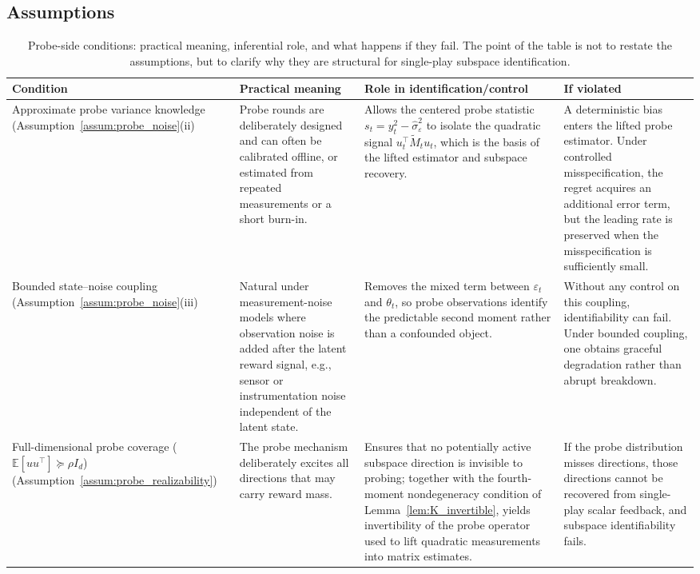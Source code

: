 \documentclass{article}
\begin{document}
\subsection{Assumptions}
\begin{table}[!htpb]
\centering
\small
\setlength{\tabcolsep}{4pt}
\renewcommand{\arraystretch}{1.12}
\caption{Probe-side conditions: practical meaning, inferential role, and what happens if they fail. The point of the table is not to restate the assumptions, but to clarify why they are structural for single-play subspace identification.}
\label{tab:probe_assumptions}
\begin{tabularx}{\linewidth}{
>{\raggedright\arraybackslash}p{2.2cm}
>{\raggedright\arraybackslash}X
>{\raggedright\arraybackslash}X
>{\raggedright\arraybackslash}X
}
\toprule
\textbf{Condition} & \textbf{Practical meaning} & \textbf{Role in identification/control} & \textbf{If violated} \\
\midrule

Approximate probe variance knowledge
(Assumption~\ref{assum:probe_noise}(ii)
&
Probe rounds are deliberately designed and can often be calibrated offline, or estimated from repeated measurements or a short burn-in.
&
Allows the centered probe statistic
\(
s_t = y_t^2 - \hat{\sigma}_\varepsilon^2
\)
to isolate the quadratic signal
\(
u_t^\top \widetilde M_t u_t
\),
which is the basis of the lifted estimator and subspace recovery.
&
A deterministic bias enters the lifted probe estimator. Under controlled misspecification, the regret acquires an additional error term, but the leading rate is preserved when the misspecification is sufficiently small. \\

\midrule

Bounded state--noise coupling
(Assumption~\ref{assum:probe_noise}(iii)
&
Natural under measurement-noise models where observation noise is added after the latent reward signal, e.g., sensor or instrumentation noise independent of the latent state.
&
Removes the mixed term between \(\varepsilon_t\) and \(\theta_t\), so probe observations identify the predictable second moment rather than a confounded object.
&
Without any control on this coupling, identifiability can fail. Under bounded coupling, one obtains graceful degradation rather than abrupt breakdown. \\

\midrule

Full-dimensional probe coverage
(\(\mathbb E[uu^\top] \succeq \rho I_d\)) (Assumption~\ref{assum:probe_realizability})
&
The probe mechanism deliberately excites all directions that may carry reward mass.
&
Ensures that no potentially active subspace direction is invisible to probing; together with the fourth-moment nondegeneracy condition of Lemma~\ref{lem:K_invertible}, yields invertibility of the probe operator used to lift quadratic measurements into matrix estimates.
&
If the probe distribution misses directions, those directions cannot be recovered from single-play scalar feedback, and subspace identifiability fails. \\

\bottomrule
\end{tabularx}
\end{table}
\end{document}
